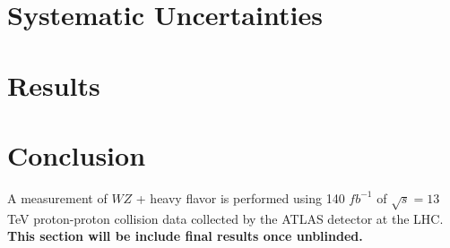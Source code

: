 \documentclass[NOTE, atlasdraft=true, texlive=2016, UKenglish]{\ATLASLATEXPATH atlasdoc}
\begin{document}
%

\section{Systematic Uncertainties}
\label{sec:sys}


\section{Results}
\label{sec:results}



\section{Conclusion}
\label{sec:conclusion}

A measurement of $WZ$ + heavy flavor is performed using 140 $fb^{-1}$ of $\sqrt{s} = 13$ TeV proton-proton collision data collected by the ATLAS detector at the LHC. \textbf{This section will be include final results once unblinded.}%

\printbibliography
%
%

\end{document}
